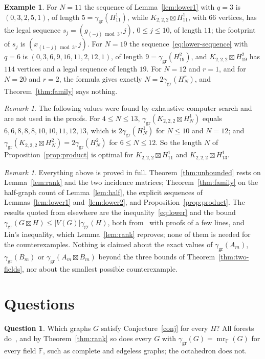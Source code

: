 \documentclass[11pt,a4paper,reqno]{amsart}
\theoremstyle{definition}
\newtheorem{question}[theorem]{Question}
\newtheorem{example}[theorem]{Example}
\theoremstyle{remark}
\newtheorem{remark}[theorem]{Remark}
\numberwithin{equation}{section}
\newcommand{\ggr}{\gamma_{\mathrm{gr}}}
\newcommand{\sprod}{\boxtimes}
\newcommand{\oct}{K_{2,2,2}}
\newcommand{\F}{\mathbb{F}}
\begin{document}
\begin{example}\label{ex:small}
For $N=11$ the sequence of Lemma~\ref{lem:lower1} with $q=3$ is $(0,3,2,5,1)$, of length $5=\ggr(H^1_{11})$, while $\oct\sprod H^1_{11}$, with $66$ vertices, has the legal sequence $s_j=(g_{(-j)\bmod 3},j)$, $0\le j\le10$, of length $11$; the footprint of $s_j$ is $(x_{(1-j)\bmod3},j)$. For $N=19$ the sequence~\eqref{eq:lower-sequence} with $q=6$ is $(0,3,6,9,16,\allowbreak11,2,12,1)$, of length $9=\ggr(H^2_{19})$, and $\oct\sprod H^2_{19}$ has $114$ vertices and a legal sequence of length $19$. For $N=12$ and $r=1$, and for $N=20$ and $r=2$, the formula gives exactly $N=2\ggr(H^r_N)$, and Theorem~\ref{thm:family} says nothing.
\end{example}

\begin{remark}\label{rem:computed}
The following values were found by exhaustive computer search and are not used in the proofs. For $4\le N\le13$, $\ggr(\oct\sprod H^1_N)$ equals $6,6,8,8,8,10,10,11,12,13$, which is $2\ggr(H^1_N)$ for $N\le10$ and $N=12$; and $\ggr(\oct\sprod H^2_N)=2\ggr(H^2_N)$ for $6\le N\le12$. So the length $N$ of Proposition~\ref{prop:product} is optimal for $\oct\sprod H^1_{11}$ and $\oct\sprod H^1_{13}$.
\end{remark}

\begin{remark}\label{rem:scope}
Everything above is proved in full. Theorem~\ref{thm:unbounded} rests on Lemma~\ref{lem:rank} and the two incidence matrices; Theorem~\ref{thm:family} on the half-graph count of Lemma~\ref{lem:half}, the explicit sequences of Lemmas~\ref{lem:lower1} and~\ref{lem:lower2}, and Proposition~\ref{prop:product}. The results quoted from elsewhere are the inequality~\eqref{eq:lower} and the bound $\ggr(G\sprod H)\le|V(G)|\ggr(H)$, both from~\cite{BBG} with proofs of a few lines, and Lin's inequality, which Lemma~\ref{lem:rank} reproves; none of them is needed for the counterexamples. Nothing is claimed about the exact values of $\ggr(A_m)$, $\ggr(B_m)$ or $\ggr(A_m\sprod B_m)$ beyond the three bounds of Theorem~\ref{thm:two-fields}, nor about the smallest possible counterexample.
\end{remark}

\section{Questions}

\begin{question}
Which graphs $G$ satisfy Conjecture~\ref{conj} for every $H$? All forests do~\cite{BDKW}, and by Theorem~\ref{thm:rank} so does every $G$ with $\ggr(G)=\operatorname{mr}_\F(G)$ for every field $\F$, such as complete and edgeless graphs; the octahedron does not.
\end{question}
\end{document}
